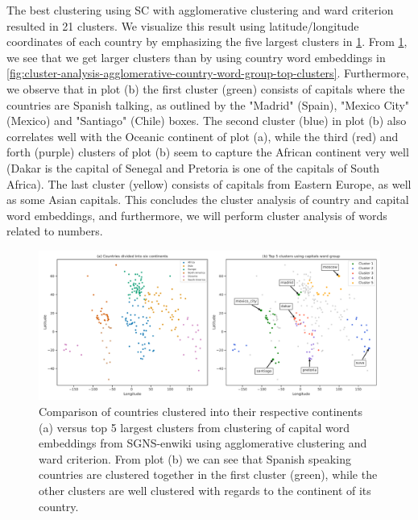 The best clustering using SC with agglomerative clustering and ward criterion resulted in 21 clusters. We visualize this result using latitude/longitude coordinates of each country by emphasizing the five largest clusters in \cref{fig:cluster-analysis-agglomerative-country-capitals-word-group-top-clusters}. From \cref{fig:cluster-analysis-agglomerative-country-capitals-word-group-top-clusters}, we see that we get larger clusters than by using country word embeddings in \cref{fig:cluster-analysis-agglomerative-country-word-group-top-clusters}. Furthermore, we observe that in plot (b) the first cluster (green) consists of capitals where the countries are Spanish talking, as outlined by the "Madrid" (Spain), "Mexico City" (Mexico) and "Santiago" (Chile) boxes. The second cluster (blue) in plot (b) also correlates well with the Oceanic continent of plot (a), while the third (red) and forth (purple) clusters of plot (b) seem to capture the African continent very well (Dakar is the capital of Senegal and Pretoria is one of the capitals of South Africa). The last cluster (yellow) consists of capitals from Eastern Europe, as well as some Asian capitals. This concludes the cluster analysis of country and capital word embeddings, and furthermore, we will perform cluster analysis of words related to numbers.
\begin{figure}[H]
    \centering
    \includegraphics[width=\textwidth]{thesis/figures/cluster-analysis-agglomerative-country-capitals-word-group-top-clusters.pdf}
    \caption{Comparison of countries clustered into their respective continents (a) versus top 5 largest clusters from clustering of capital word embeddings from SGNS-enwiki using agglomerative clustering and ward criterion. From plot (b) we can see that Spanish speaking countries are clustered together in the first cluster (green), while the other clusters are well clustered with regards to the continent of its country.}
    \label{fig:cluster-analysis-agglomerative-country-capitals-word-group-top-clusters}
\end{figure}

